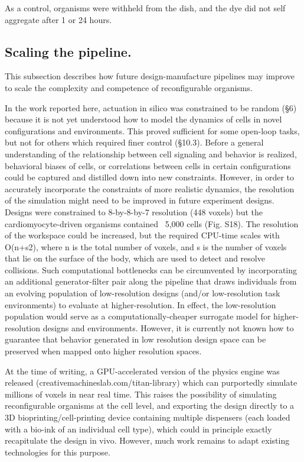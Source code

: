 As a control, organisms were withheld from the dish, and the dye did not self aggregate after 1 or 24 hours. 


\subsection*{Scaling the pipeline.}

This subsection describes how future design-manufacture pipelines may improve to scale the complexity and competence of reconfigurable organisms.

In the work reported here, actuation in silico was constrained to be random (§6) because it is not yet understood how to model the dynamics of cells in novel configurations and environments. This proved sufficient for some open-loop tasks, but not for others which required finer control (§10.3). Before a general understanding of the relationship between cell signaling and behavior is realized, behavioral biases of cells, or correlations between cells in certain configurations could be captured and distilled down into new constraints. However, in order to accurately incorporate the constraints of more realistic dynamics, the resolution of the simulation might need to be improved in future experiment designs.
Designs were constrained to 8-by-8-by-7 resolution (448 voxels) but the cardiomyocyte-driven organisms contained ~5,000 cells (Fig. S18). The resolution of the workspace could be increased, but the required CPU-time scales with O(n+s2), where n is the total number of voxels, and s is the number of voxels that lie on the surface of the body, which are used to detect and resolve collisions. Such computational bottlenecks can be circumvented by incorporating an additional generator-filter pair along the pipeline that draws individuals from an evolving population of low-resolution designs (and/or low-resolution task environments) to evaluate at higher-resolution. In effect, the low-resolution population would serve as a computationally-cheaper surrogate model for higher-resolution designs and environments. However, it is currently not known how to guarantee that behavior generated in low resolution design space can be preserved when mapped onto higher resolution spaces.

At the time of writing, a GPU-accelerated version of the physics engine was released (creativemachineslab.com/titan-library) which can purportedly simulate millions of voxels in near real time. This raises the possibility of simulating reconfigurable organisms at the cell level, and exporting the design directly to a 3D bioprinting/cell-printing device containing multiple dispensers (each loaded with a bio-ink of an individual cell type), which could in principle exactly recapitulate the design in vivo. However, much work remains to adapt existing technologies for this purpose.




